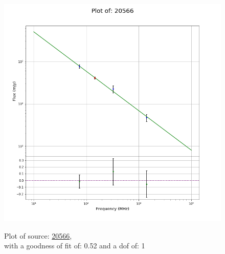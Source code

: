 \documentclass{article}
\begin{document}
\begin{figure}[H]
    \centering
    \begin{minipage}{.5\textwidth}
        \centering
        \includegraphics[scale = 0.35]{KmeulenTrap4P23_1min/1min20566.png}
        \captionsetup{labelformat=empty}
        \caption{Plot of source: \href{http://banana.transientskp.org/r4/vlo_KmeulenTrap4P23/runningcatalog/20566}{20566},\\with a goodness of fit of: 0.52 and a dof of: 1}
        \addtocounter{figure}{-1}
        \label{KmeulenTrap4P23:1min:20566:plot}
    \end{minipage}%
    \begin{minipage}{0.5\textwidth}
        \centering


\end{minipage}
\end{figure}
\end{document}
